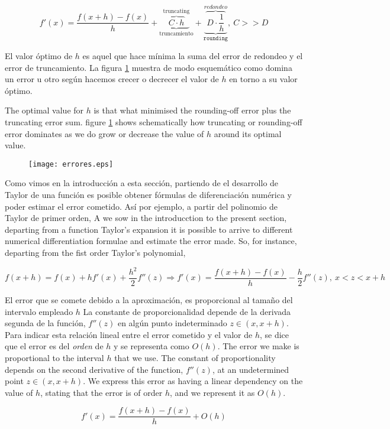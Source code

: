 \begin{equation*}
f'(x)=\frac{f(x+h)-f(x)}{h}+\underbrace{\overbrace{C\cdot h}^{\mathrm{ truncating}}}_{\mathrm{truncamiento}}+\underbrace{\overbrace{D\cdot \frac{1}{h}}^{redondeo}}_{\mathtt{rounding}}, \ C>>D 
\end{equation*}
\begin{paracol}{2}
El valor óptimo de $h$ es aquel que hace mínima la suma del error de redondeo y el error de truncamiento. La figura \ref{fig:errores} muestra de modo esquemático como domina un error u otro según hacemos crecer o decrecer el valor de $h$ en torno a su valor óptimo.
\switchcolumn

The optimal value for $h$ is that what minimised the rounding-off error plus the truncating error sum. figure \ref{fig:errores} shows schematically  how truncating or rounding-off error dominates as we do grow or decrease the value of $h$ around its optimal value.
\end{paracol}
\begin{figure}[h]
\centering
\texttt{[image: errores.eps]}
\label{fig:errores}
\end{figure}
\begin{paracol}{2}
Como vimos en la introducción a esta sección, partiendo de el desarrollo de Taylor de una función es posible obtener fórmulas de diferenciación numérica y poder estimar el error cometido. Así por ejemplo, a  partir del polinomio de Taylor de primer orden,
\switchcolumn
A we sow in the introducction to the present section, departing from a function Taylor's expansion it is possible to arrive to different numerical differentiation formulae and estimate the error made. So, for instance, departing from the fist order Taylor's polynomial,
\end{paracol}
\begin{equation*}
f(x+h)=f(x)+hf'(x)+\frac{h^2}{2}f''(z) \Rightarrow f'(x)=\frac{f(x+h)-f(x)}{h}-\frac{h}{2}f''(z), \ x<z<x+h
\end{equation*}
\begin{paracol}{2}
El error que se comete debido a la aproximación, es proporcional al tamaño del intervalo empleado $h$ La constante de proporcionalidad depende de la derivada segunda de la función, $f''(z)$ en algún punto indeterminado $z\in (x,x+h)$. Para indicar esta relación lineal entre el error cometido y el valor de $h$, se dice que el error es del \emph{orden} de $h$ y se representa como $O(h)$.
\switchcolumn
The error we make is proportional to the interval $h$ that we use. The constant of proportionality depends on the second derivative of the function, $f''(z)$, at an undetermined point $z \in (x, x+h)$. We express this error as having a linear dependency on the value of $h$, stating that the error is of order $h$, and we represent it as $O(h)$.
\end{paracol}
\begin{equation*}
f'(x)=\frac{f(x+h)-f(x)}{h}+O(h)
\end{equation*}

